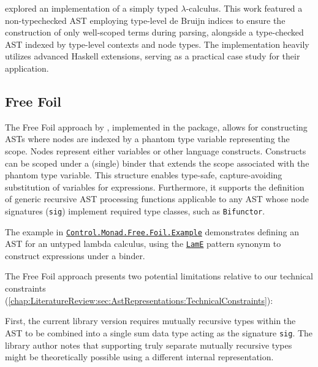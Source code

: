 \citeauthor{eisenberg-stitch-2020} \cite{eisenberg-stitch-2020} explored an implementation of a simply typed $\lambda$-calculus. This work featured a non-typechecked AST employing type-level de Bruijn indices to ensure the construction of only well-scoped terms during parsing, alongside a type-checked AST indexed by type-level contexts and node types. The implementation heavily utilizes advanced Haskell extensions, serving as a practical case study for their application.

\subsection{Free Foil}
\label{chap:LiteratureReview:sec:AstRepresentations:FreeFoil}

The Free Foil approach \cite{kudasov-free-2024} by \citeauthor{kudasov-free-2024}, implemented in the \cite{free-foil-hackage} package, allows for constructing ASTs where nodes are indexed by a phantom type variable representing the scope. Nodes represent either variables or other language constructs. Constructs can be scoped under a (single) binder that extends the scope associated with the phantom type variable. This structure enables type-safe, capture-avoiding substitution of variables for expressions. Furthermore, it supports the definition of generic recursive AST processing functions applicable to any AST whose node signatures (\texttt{sig}) implement required type classes, such as \texttt{Bifunctor}.

The example in \href{https://hackage.haskell.org/package/free-foil-0.2.0/docs/Control-Monad-Free-Foil-Example.html}{\texttt{Control.Monad.Free.Foil.Example}} demonstrates defining an AST for an untyped lambda calculus, using the \href{https://hackage.haskell.org/package/free-foil-0.2.0/docs/src/Control.Monad.Free.Foil.Example.html#LamE}{\texttt{LamE}} pattern synonym to construct expressions under a binder.

The Free Foil approach presents two potential limitations relative to our technical constraints (\cref{chap:LiteratureReview:sec:AstRepresentations:TechnicalConstraints}):

First, the current library version requires mutually recursive types within the AST to be combined into a single sum data type acting as the signature \texttt{sig}. The library author notes that supporting truly separate mutually recursive types might be theoretically possible using a different internal representation.

